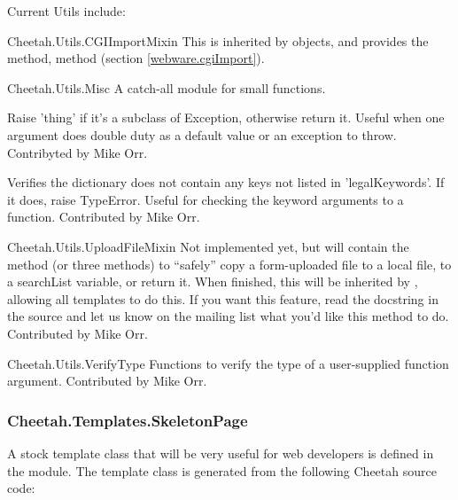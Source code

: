 Current Utils include:
\begin{description}
\item{Cheetah.Utils.CGIImportMixin} This is inherited by 
     objects, and provides the method,  method
     (section \ref{webware.cgiImport}).

\item{Cheetah.Utils.Misc} A catch-all module for small functions.
     \begin{description}
     \item{}  Raise 'thing' if it's a 
          subclass of Exception, otherwise return it.  Useful when one
	  argument does double duty as a default value or an exception to
	  throw.  Contribyted by Mike Orr.

     \item{}  
          Verifies the dictionary does not contain any keys not listed in
	  'legalKeywords'.  If it does, raise TypeError.  Useful for
	  checking the keyword arguments to a function.  Contributed by
	  Mike Orr.
     \end{description}

\item{Cheetah.Utils.UploadFileMixin} Not implemented yet, but will contain
     the  method (or three methods) to ``safely'' copy a
     form-uploaded file to a local file, to a searchList variable, or return
     it.  When finished, this will be inherited by , allowing 
     all templates to do this.  If you want this feature, read the docstring
     in the source and let us know on the mailing list what you'd like this
     method to do.  Contributed by Mike Orr.

\item{Cheetah.Utils.VerifyType} Functions to verify the type of a
     user-supplied function argument.  Contributed by Mike Orr.
\end{description}

\subsubsection{Cheetah.Templates.SkeletonPage}
\label{libraries.templates.skeletonPage}

A stock template class that will be very useful for web developers is defined in
the  module.  The 
template class is generated from the following Cheetah source code:

